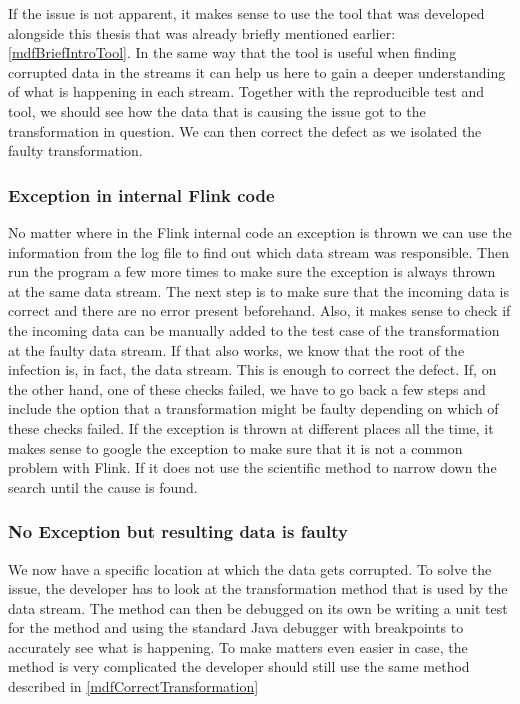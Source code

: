 If the issue is not apparent, it makes sense to use the tool that was developed alongside this thesis that was already briefly mentioned earlier: \ref{mdfBriefIntroTool}. In the same way that the tool is useful when finding corrupted data in the streams it can help us here to gain a deeper understanding of what is happening in each stream. Together with the reproducible test and tool, we should see how the data that is causing the issue got to the transformation in question. We can then correct the defect as we isolated the faulty transformation.

\subsubsection{Exception in internal Flink code}
No matter where in the Flink internal code an exception is thrown we can use the information from the log file to find out which data stream was responsible. Then run the program a few more times to make sure the exception is always thrown at the same data stream. The next step is to make sure that the incoming data is correct and there are no error present beforehand. Also, it makes sense to check if the incoming data can be manually added to the test case of the transformation at the faulty data stream. If that also works, we know that the root of the infection is, in fact, the data stream. This is enough to correct the defect. If, on the other hand, one of these checks failed, we have to go back a few steps and include the option that a transformation might be faulty depending on which of these checks failed. If the exception is thrown at different places all the time, it makes sense to google the exception to make sure that it is not a common problem with Flink. If it does not use the scientific method to narrow down the search until the cause is found.

\subsubsection{No Exception but resulting data is faulty}
We now have a specific location at which the data gets corrupted. To solve the issue, the developer has to look at the transformation method that is used by the data stream. The method can then be debugged on its own be writing a unit test for the method and using the standard Java debugger with breakpoints to accurately see what is happening. To make matters even easier in case, the method is very complicated the developer should still use the same method described in \ref{mdfCorrectTransformation}

